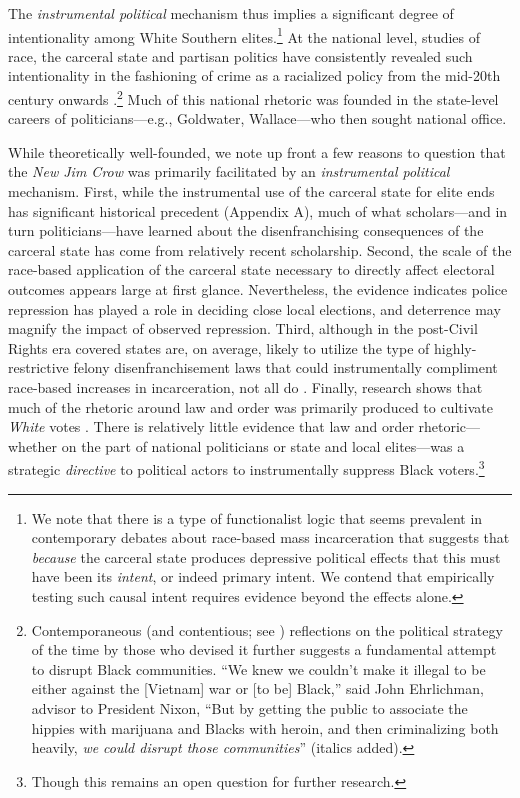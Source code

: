 \documentclass[12pt]{article}
\begin{document}
The \emph{instrumental political} mechanism thus implies a significant degree of intentionality among White Southern elites.\footnote{We note that there is a type of functionalist logic that seems prevalent in contemporary debates about race-based mass incarceration that suggests that \emph{because} the carceral state produces depressive political effects that this must have been its \emph{intent}, or indeed primary intent.  We contend that empirically testing such causal intent requires evidence beyond the effects alone.}  At the national level, studies of race, the carceral state and partisan politics have consistently revealed such intentionality in the fashioning of crime as a racialized policy from the mid-20th century onwards \citep{Weaver:2007vr}.\footnote{Contemporaneous (and contentious; see \cite{LoBianco:2016wla}) reflections on the political strategy of the time by those who devised it further suggests a fundamental attempt to disrupt Black communities.  ``We knew we couldn't make it illegal to be either against the [Vietnam] war or [to be] Black,'' said John Ehrlichman, advisor to President Nixon, ``But by getting the public to associate the hippies with marijuana and Blacks with heroin, and then criminalizing both heavily, \emph{we could disrupt those communities}'' \citep{Baum:2016uy} (italics added).}  Much of this national rhetoric was founded in the state-level careers of politicians---e.g., Goldwater, Wallace---who then sought national office.

While theoretically well-founded, we note up front a few reasons to question that the \emph{New Jim Crow} was primarily facilitated by an \emph{instrumental political} mechanism.  First, while the instrumental use of the carceral state for elite ends has significant historical precedent (Appendix A), much of what scholars---and in turn politicians---have learned about the disenfranchising consequences of the carceral state has come from relatively recent scholarship.  Second, the scale of the race-based application of the carceral state necessary to directly affect electoral outcomes appears large at first glance.  Nevertheless, the evidence indicates police repression has played a role in deciding close local elections, and deterrence may magnify the impact of observed repression.  Third, although in the post-Civil Rights era covered states are, on average, likely to utilize the type of highly-restrictive felony disenfranchisement laws that could instrumentally compliment race-based increases in incarceration, not all do \citep{Behrens:2003th}. Finally, research shows that much of the rhetoric around law and order was primarily produced to cultivate \emph{White} votes \citep{Phillips:1969tb,Lopez:2015vp}.  There is relatively little evidence that law and order rhetoric---whether on the part of national politicians or state and local elites---was a strategic \emph{directive} to political actors to instrumentally suppress Black voters.\footnote{Though this remains an open question for further research.}
\end{document}
